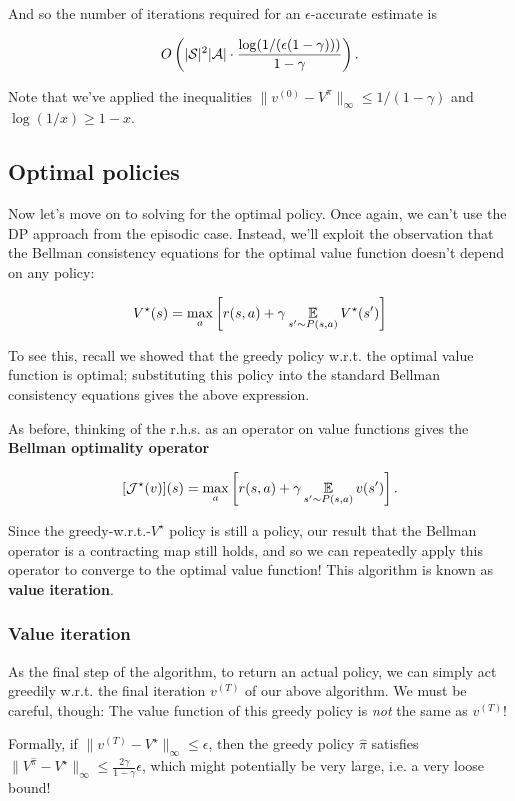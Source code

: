 \documentclass[../main/main]{subfiles}
\begin{document}
And so the number of iterations required for an $\epsilon$-accurate estimate is

\[ O\left( |\mathcal{S}|^2 |\mathcal{A}| \cdot \frac{\log(1/(\epsilon (1-\gamma)))}{1-\gamma} \right). \]

Note that we've applied the inequalities $\|v^{(0)} - V^\pi\|_{\infty} \le 1/(1-\gamma)$ and $\log (1/x) \ge 1-x$.

\subsection{Optimal policies}

Now let's move on to solving for the optimal policy. Once again, we can't use the DP approach from the episodic case. Instead, we'll exploit the observation that the Bellman consistency equations for the optimal value function doesn't depend on any policy:

\[
    V^\star(s) = \max_a \left[ r(s, a) + \gamma \operatorname*{\mathbb{E}}_{s' \sim P(s, a)} V^\star(s') \right]
\]

To see this, recall we showed that the greedy policy w.r.t. the optimal value function is optimal; substituting this policy into the standard Bellman consistency equations gives the above expression.

As before, thinking of the r.h.s. as an operator on value functions gives the \textbf{Bellman optimality operator}

\[
    [\mathcal{J}^{\star}(v)](s) = \max_a \left[ r(s, a) + \gamma \operatorname*{\mathbb{E}}_{s' \sim P(s, a)} v(s') \right].
\]

Since the greedy-w.r.t.-$V^\star$ policy is still a policy, our result that the Bellman operator is a contracting map still holds, and so we can repeatedly apply this operator to converge to the optimal value function! This algorithm is known as \textbf{value iteration}.


\subsubsection{Value iteration}



As the final step of the algorithm, to return an actual policy, we can simply act greedily w.r.t. the final iteration $v^{(T)}$ of our above algorithm. We must be careful, though: The value function of this greedy policy is \emph{not} the same as $v^{(T)}$!

Formally, if $\|v^{(T)} - V^\star\|_{\infty} \le \epsilon$, then the greedy policy $\hat \pi$ satisfies $\|V^{\hat \pi} - V^\star\|_{\infty} \le \frac{2\gamma}{1-\gamma} \epsilon$, which might potentially be very large, i.e. a very loose bound!
\end{document}
